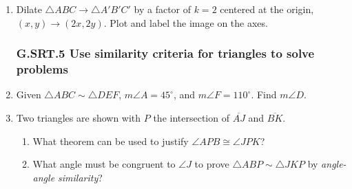\documentclass[12pt, twoside]{article}
\begin{document}
\begin{enumerate}[itemsep=0.5cm]
\item Dilate $\triangle ABC \rightarrow \triangle A'B'C'$ by a factor of $k=2$ centered at the origin, \\
$(x,y) \rightarrow (2x, 2y)$. Plot and label the image on the axes.
  \begin{center}
  \end{center}

\newpage
\subsubsection*{G.SRT.5 Use similarity criteria for triangles to solve problems}
\item Given $\triangle ABC \sim \triangle DEF$, $m\angle A=45^\circ$, and $m\angle F=110^\circ$. Find $m\angle D$. \vspace{4cm}


\item Two triangles are shown with $P$ the intersection of $\overline{AJ}$ and $\overline{BK}$.
\begin{multicols}{2}
  \begin{enumerate}
      \item What theorem can be used to justify $\angle APB \cong \angle JPK$?
      \item What angle must be congruent to $\angle J$ to prove $\triangle ABP \sim \triangle JKP$ by \emph{angle-angle similarity}? \vspace{3cm}
      \end{enumerate}
  \end{multicols}
    \vspace{1cm}


\end{enumerate}
\end{document}
